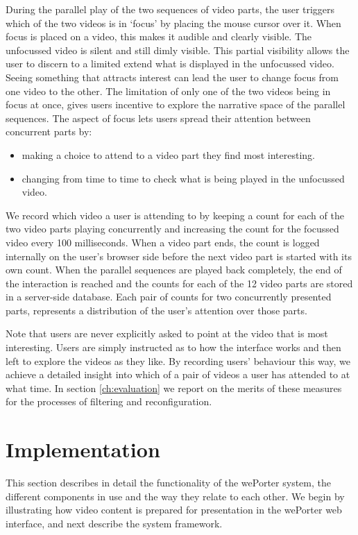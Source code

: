 During the parallel play of the two sequences of video parts, the user triggers which of the two videos is in `focus' by placing the mouse cursor over it. When focus is placed on a video, this makes it audible and clearly visible. The unfocussed video is silent and still dimly visible. This partial visibility allows the user to discern to a limited extend what is displayed in the unfocussed video. Seeing something that attracts interest can lead the user to change focus from one video to the other. The limitation of only one of the two videos being in focus at once, gives users incentive to explore the narrative space of the parallel sequences. The aspect of focus lets users spread their attention between concurrent parts by:
\begin{itemize}
  \item making a choice to attend to a video part they find most interesting.
  \item changing from time to time to check what is being played in the unfocussed video.
\end{itemize}

We record which video a user is attending to by keeping a count for each of the two video parts playing concurrently and increasing the count for the focussed video every 100 milliseconds. When a video part ends, the count is logged internally on the user's browser side before the next video part is started with its own count. When the parallel sequences are played back completely, the end of the interaction is reached and the counts for each of the 12 video parts are stored in a server-side database. Each pair of counts for two concurrently presented parts, represents a distribution of the user's attention over those parts.

Note that users are never explicitly asked to point at the video that is most interesting. Users are simply instructed as to how the interface works and then left to explore the videos as they like. By recording users' behaviour this way, we achieve a detailed insight into which of a pair of videos a user has attended to at what time. In section \ref{ch:evaluation} we report on the merits of these measures for the processes of filtering and reconfiguration.

\section{Implementation}
\label{sec:weporter_implementation}

This section describes in detail the functionality of the wePorter system, the different components in use and the way they relate to each other. We begin by illustrating how video content is prepared for presentation in the wePorter web interface, and next describe the system framework. 

